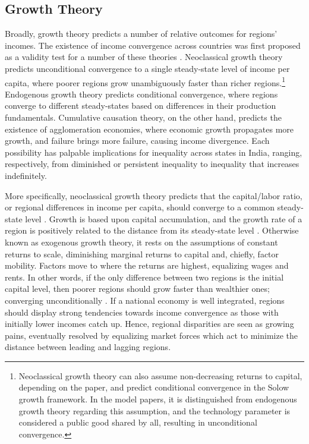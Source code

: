\documentclass[a4paper, 11pt]{article}
\begin{document}
\subsection*{Growth Theory}
Broadly, growth theory predicts a number of relative outcomes for regions’ incomes.  The existence of income convergence across countries was first proposed as a validity test for a number of these theories \citep{sala1996classical}.  Neoclassical growth theory predicts unconditional convergence to a single steady-state level of income per capita, where poorer regions grow unambiguously faster than richer regions.\footnote{Neoclassical growth theory can also assume non-decreasing returns to capital, depending on the paper, and predict conditional convergence in the Solow growth framework.  In the model papers, it is distinguished from endogenous growth theory regarding this assumption, and the technology parameter is considered a public good shared by all, resulting in unconditional convergence.}  Endogenous growth theory predicts conditional convergence, where regions converge to different steady-states based on differences in their production fundamentals.  Cumulative causation theory, on the other hand, predicts the existence of agglomeration economies, where economic growth propagates more growth, and failure brings more failure, causing income divergence.  Each possibility has palpable implications for inequality across states in India, ranging, respectively, from diminished or persistent inequality to inequality that increases indefinitely.\par
 More specifically, neoclassical growth theory predicts that the capital/labor ratio, or regional differences in income per capita, should converge to a common steady-state level \citep{solow_contribution_1956}.  Growth is based upon capital accumulation, and the growth rate of a region is positively related to the distance from its steady-state level \citep{sala1996classical}.  Otherwise known as exogenous growth theory, it rests on the assumptions of constant returns to scale, diminishing marginal returns to capital and, chiefly, factor mobility.  Factors move to where the returns are highest, equalizing wages and rents.  In other words, if the only difference between two regions is the initial capital level, then poorer regions should grow faster than wealthier ones; converging unconditionally \citep{sala1996classical}.  If a national economy is well integrated, regions should display strong tendencies towards income convergence as those with initially lower incomes catch up.  Hence, regional disparities are seen as growing pains, eventually resolved by equalizing market forces which act to minimize the distance between leading and lagging regions.  \par
\end{document}
